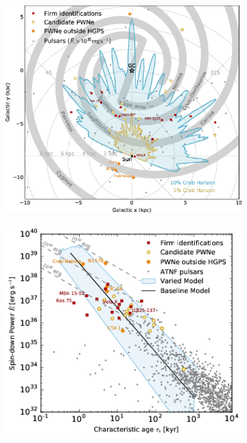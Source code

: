 \begin{figure}[h!]
	\centering
	\begin{subfigure}{0.495\textwidth}
	    \includegraphics[width=\linewidth]{04_Introduction/Images/pulsar_wind_nebula/TeV_PWN_location.eps}
	\end{subfigure}
	\hfill
	\begin{subfigure}{0.495\textwidth}
	    \includegraphics[width=\linewidth]{04_Introduction/Images/pulsar_wind_nebula/pulsar_spin_down_vs_age.png}
	\end{subfigure}
	

\end{figure}
